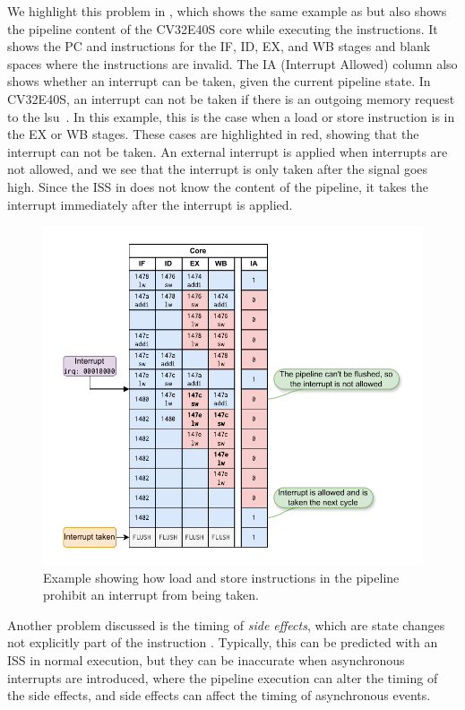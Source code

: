 We highlight this problem in , which shows the same example as  but also shows the pipeline content of the CV32E40S core while executing the instructions. It shows the PC and instructions for the IF, ID, EX, and WB stages and blank spaces where the instructions are invalid. The IA (Interrupt Allowed) column also shows whether an interrupt can be taken, given the current pipeline state. In CV32E40S, an interrupt can not be taken if there is an outgoing memory request to the \acrfull{lsu}~\cite{openhwgroupExceptionsInterruptsCOREV2023}. In this example, this is the case when a load or store instruction is in the EX or WB stages. These cases are highlighted in red, showing that the interrupt can not be taken. An external interrupt is applied when interrupts are not allowed, and we see that the interrupt is only taken after the  signal goes high. Since the ISS in  does not know the content of the pipeline, it takes the interrupt immediately after the interrupt is applied.

\begin{figure}
    \centering
    \includegraphics[width=1.00\linewidth]{figures/lw_sw_pipeline_example.pdf}
    \caption{Example showing how load and store instructions in the pipeline prohibit an interrupt from being taken.}
    \label{fig:lw_sw_pipeline}
\end{figure}


Another problem discussed is the timing of \textit{side effects}, which are state changes not explicitly part of the instruction \cite{taylorAdvancedRISCVVerification2023}. Typically, this can be predicted with an ISS in normal execution, but they can be inaccurate when asynchronous interrupts are introduced, where the pipeline execution can alter the timing of the side effects, and side effects can affect the timing of asynchronous events.









